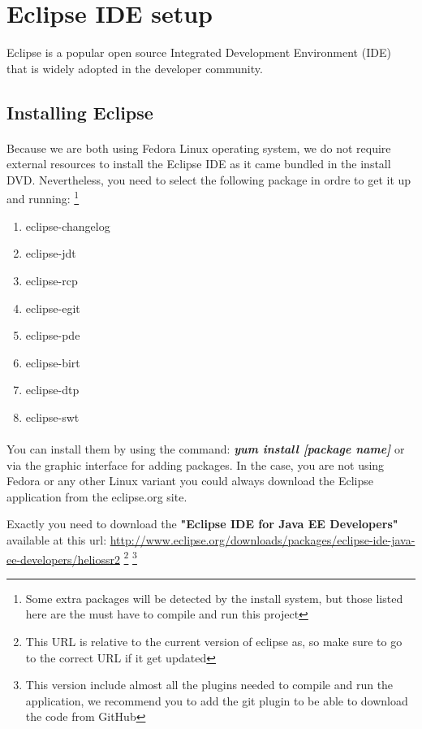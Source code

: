 \section{Eclipse IDE setup}
Eclipse is a popular open source Integrated Development Environment (IDE) that is widely
adopted in the developer community.

\subsection{Installing Eclipse}
\paragraph{}
Because we are both using Fedora Linux operating system, we do not require external resources to install the Eclipse IDE as it came bundled in the install DVD. Nevertheless, you need to select the following package in ordre to get it up and running:
\footnote{Some extra packages will be detected by the install system, but those listed here are the must have to compile and run this project}

\begin{enumerate}
\item eclipse-changelog
\item eclipse-jdt
\item eclipse-rcp
\item eclipse-egit
\item eclipse-pde
\item eclipse-birt
\item eclipse-dtp
\item eclipse-swt
\end{enumerate}

\paragraph{}
You can install them by using the command: \textit{\textbf{yum install [package name]}} or via the graphic interface for adding packages. In the case, you are not using Fedora or any other Linux variant you could always download the Eclipse application from the eclipse.org site. 

Exactly you need to download the \textbf{"Eclipse IDE for Java EE Developers"} available at this url:
\url{http://www.eclipse.org/downloads/packages/eclipse-ide-java-ee-developers/heliossr2}
\footnote{This URL is relative to the current version of eclipse as, so make sure to go to the correct URL if it get updated}
\footnote{This version include almost all the plugins needed to compile and run the application, we recommend you to add the git plugin to be able to download the code from GitHub}

